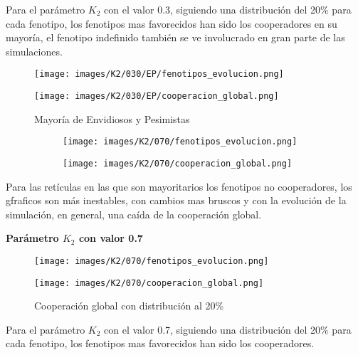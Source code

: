 \documentclass[a4paper,12pt]{report}
\begin{document}
Para el parámetro \( K_2 \) con el valor 0.3, siguiendo una distribución del 20\% para cada fenotipo, los fenotipos mas favorecidos han sido los cooperadores en su mayoría, el fenotipo indefinido también se ve involucrado en gran parte de las simulaciones.


\newpage

\begin{figure}[h]
    \centering
    \begin{minipage}{0.49\textwidth}
    \centering
    \texttt{[image: images/K2/030/EP/fenotipos\_evolucion.png]}
    \label{fig:enter-label}
    \end{minipage}
    \hfill
    \begin{minipage}{0.49\textwidth}
    \centering
    \texttt{[image: images/K2/030/EP/cooperacion\_global.png]}
    \label{fig:enter-label}
    \end{minipage}
    \caption{Mayoría de Envidiosos y Pesimistas}
\end{figure}



\begin{figure}[!h]
    \centering
    \begin{subfigure}[t]{0.49\textwidth}
        \centering
        \texttt{[image: images/K2/070/fenotipos\_evolucion.png]}
        \label{fig:enter-label}
    \end{subfigure}
    \hfill
    \begin{subfigure}[t]{0.49\textwidth}
        \centering
        \texttt{[image: images/K2/070/cooperacion\_global.png]}
        \label{fig:enter-label}
    \end{subfigure}
    \caption{}
\end{figure}

Para las retículas en las que son mayoritarios los fenotipos no cooperadores, los gfraficos son más inestables, con cambios mas bruscos y con la evolución de la simulación, en general, una caída de la cooperación global.

\newpage

\vspace{1.5em}
\noindent\textbf{Parámetro \( K_2 \) con valor 0.7}
\vspace{0.5em}

\begin{figure}[h!]
    \centering
    \begin{minipage}{0.49\textwidth}
    \centering
    \texttt{[image: images/K2/070/fenotipos\_evolucion.png]}
    \label{fig:enter-label}
    \end{minipage}
    \hfill
    \begin{minipage}{0.49\textwidth}
    \centering
    \texttt{[image: images/K2/070/cooperacion\_global.png]}
    \label{fig:enter-label}
    \end{minipage}
    \caption{Cooperación global con distribución al 20\%}
\end{figure}
Para el parámetro \( K_2 \) con el valor 0.7, siguiendo una distribución del 20\% para cada fenotipo, los fenotipos mas favorecidos han sido los cooperadores.
\end{document}
